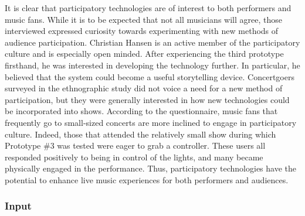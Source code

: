 It is clear that participatory technologies are of interest to both performers and music fans. While it is to be expected that not all musicians will agree, those interviewed expressed curiosity towards experimenting with new methods of audience participation. Christian Hansen is an active member of the participatory culture and is especially open minded. After experiencing the third prototype firsthand, he was interested in developing the technology further. In particular, he believed that the system could become a useful storytelling device. Concertgoers surveyed in the ethnographic study did not voice a need for a new method of participation, but they were generally interested in how new technologies could be incorporated into shows. According to the questionnaire, music fans that frequently go to small-sized concerts are more inclined to engage in participatory culture. Indeed, those that attended the relatively small show during which Prototype \#3 was tested were eager to grab a controller. These users all responded positively to being in control of the lights, and many became physically engaged in the performance. Thus, participatory technologies have the potential to enhance live music experiences for both performers and audiences.

\subsubsection{Input}

